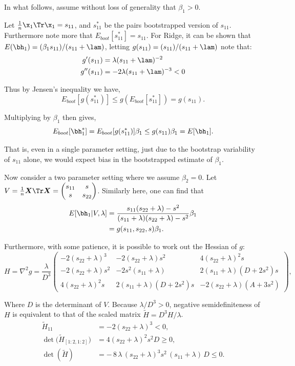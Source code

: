 In what follows, assume without loss of generality that $\beta_1 > 0$. 

Let $\frac{1}{n}\x_1\Tr\x_1 = s_{11}$, and $s_{11}^*$ be the pairs bootstrapped version of $s_{11}$. Furthermore note more that $E_{boot}[s_{11}^*] = s_{11}$. For Ridge, it can be shown that $E(\bh_1) = (\beta_1s_{11})/(s_{11} + \lam)$, letting $g(s_{11}) = (s_{11})/(s_{11} + \lam)$ note that:
$$
\begin{aligned}
g'(s_{11}) &= \lambda (s_{11} + \lam)^{-2} \\
g''(s_{11}) &= -2\lambda (s_{11} + \lam)^{-3} < 0
\end{aligned}
$$

\noindent Thus by Jensen's inequality we have,
$$
E_{boot}[g(s_{11}^*)] \leq g(E_{boot}[s_{11}^*]) = g(s_{11}).
$$

\noindent Multiplying by $\beta_1$ then gives,
$$
E_{boot}[\bh_1^*] = E_{boot}[g(s_{11}^*)]\beta_1 \leq g(s_{11})\beta_1 = E[\bh_1].
$$

\noindent That is, even in a single parameter setting, just due to the bootstrap variability of $s_{11}$ alone, we would expect bias in the bootstrapped estimate of $\beta_1$.

Now consider a two parameter setting where we assume $\beta_2 = 0$. Let $V = \frac{1}{n}\boldsymbol{X}\Tr\boldsymbol{X} = \begin{pmatrix} s_{11} & s \\ s & s_{22} \end{pmatrix}$. Similarly here, one can find that
$$
\begin{aligned}
E[\bh_1 | V, \lambda] &= \frac{s_{11}(s_{22} + \lambda) - s^2}{(s_{11} + \lambda)(s_{22} + \lambda) - s^2} \beta_1 \\
&= g(s_{11}, s_{22}, s)\beta_1.
\end{aligned}
$$

\noindent Furthermore, with some patience, it is possible to work out the Hessian of $g$:
$$
H = \nabla^{2}g
= \frac{\lambda}{D^{3}}
  \begin{pmatrix}
    -2(s_{22}+\lambda)^{3} & -2(s_{22}+\lambda)s^{2} & 4(s_{22}+\lambda)^{2}s\\[6pt]
    -2(s_{22}+\lambda)s^{2} & -2s^{2}(s_{11}+\lambda) & 2(s_{11}+\lambda)(D+2s^{2})s\\[6pt]
     4(s_{22}+\lambda)^{2}s &  2(s_{11}+\lambda)(D+2s^{2})s & -2(s_{22}+\lambda)(A+3s^{2})
  \end{pmatrix},
$$

\noindent Where $D$ is the determinant of $V$. Because $\lambda/D^{3}>0$, negative semidefiniteness of $H$ is equivalent to that of the scaled matrix $\tilde H = D^{3}H/\lambda$.
$$
\begin{aligned}
\tilde H_{11} &= -2(s_{22}+\lambda)^{3} < 0, \\
\det\bigl(\tilde H_{[1:2,1:2]}\bigr) &= 4(s_{22}+\lambda)^{2}s^{2}D \geq 0, \\
\det(\tilde H) &= -\,8\,\lambda\,(s_{22}+\lambda)^{3}s^{2}\,(s_{11}+\lambda)\,D \leq 0.
\end{aligned}
$$

